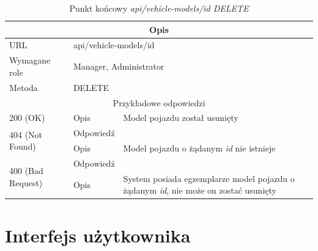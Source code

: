 \documentclass[eng,printmode,openany]{mgr}
\begin{document}
\begin{table}[]
	\caption{Punkt końcowy \textit{api/vehicle-models/id DELETE}}
	\begin{tabularx}{\textwidth}{|l|l|X|}
		\hline
		\multicolumn{3}{|c|}{Opis}                         						\\ \hline
		URL                       & \multicolumn{2}{l|}{api/vehicle-models/id} 	\\ \hline
		Wymagane role             & \multicolumn{2}{l|}{Manager, Administrator} \\ \hline
		Metoda                    & \multicolumn{2}{l|}{DELETE} 				\\ \hline
		\multicolumn{3}{|c|}{ Przykładowe odpowiedzi}                   		\\ \hline
		200 (OK)			& Opis         	& Model pojazdu został usunięty		\\ \hline
		\multirow{2}{*}{404 (Not Found)} 	& Odpowiedź     &      \\ \cline{2-3} 
		& Opis          & Model pojazdu o żądanym \textit{id} nie istnieje  													\\ \hline
		\multirow{2}{*}{400 (Bad Request)} 	& Odpowiedź     &      \\ \cline{2-3} 
		& Opis          & System posiada egzemplarze model pojazdu o żądanym \textit{id}, nie może on zostać usunięty   													\\ \hline
	\end{tabularx}
\end{table}


\newpage
\section{Interfejs użytkownika}
\end{document}
